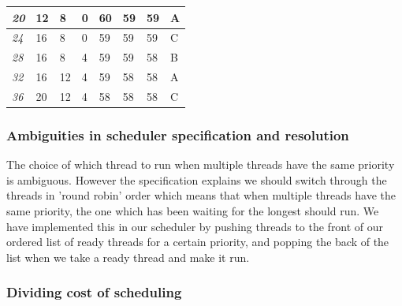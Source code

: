 \documentclass{article}
\renewcommand{\_}{\char`_}
\begin{document}
\begin{table}[]
\begin{tabular}{|l|l|l|l|l|l|l|l|}
\textit{20}                                                                      & 12           & 8            & 0           & 60          & 59          & 59         & A                                                                                 \\ \hline
\textit{24}                                                                      & 16           & 8            & 0           & 59          & 59          & 59         & C                                                                                 \\ \hline
\textit{28}                                                                      & 16           & 8            & 4           & 59          & 59          & 58         & B                                                                                 \\ \hline
\textit{32}                                                                      & 16           & 12           & 4           & 59          & 58          & 58         & A                                                                                 \\ \hline
\textit{36}                                                                      & 20           & 12           & 4           & 58          & 58          & 58         & C                                                                                 \\ \hline
\end{tabular}
\end{table}


\subsubsection{Ambiguities in scheduler specification and resolution}


The choice of which thread to run when multiple threads have the same priority is ambiguous. However the specification explains we should switch through the threads in 'round robin' order which means that when multiple threads have the same priority, the one which has been waiting for the longest should run. We have implemented this in our scheduler by pushing threads to the front of our ordered list of ready threads for a certain priority, and popping the back of the list when we take a ready thread and make it run. 


\subsubsection{Dividing cost of scheduling}
\end{document}

